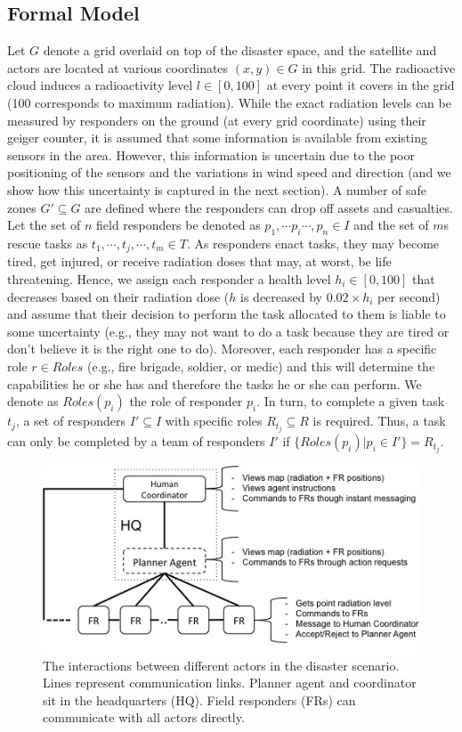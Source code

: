 \subsection{Formal Model}
\noindent Let $G$ denote a grid overlaid on top of the disaster space, and the satellite and actors are located at various coordinates $(x,y) \in G$ in this grid. The radioactive cloud induces a radioactivity level  $l \in [0,100]$ at every point it covers in the grid (100 corresponds to maximum radiation). While the exact radiation levels can be measured by responders on the ground (at every grid coordinate) using their geiger counter, it is assumed that some information is available  from existing sensors  in the area. However, this information is uncertain due to the poor positioning of the sensors and the variations in wind speed and direction (and we show how this uncertainty is captured in the next section). A number of safe zones $G' \subseteq G$ are defined where the responders can drop off assets and casualties. Let the set of $n$ field responders be denoted as $p_1, \cdots p_i \cdots, p_n \in I$ and the set of $m$s rescue tasks as  $t_1,\cdots, t_j, \cdots, t_m\in T$.  As responders enact tasks, they may become tired, get injured, or receive radiation doses that may, at worst, be life threatening. Hence, we assign each responder  a health level $h_i\in [0,100]$ that decreases based on their radiation dose ($h$ is decreased by $0.02 \times h_i $ per second) and assume that their decision to perform the task allocated to them is liable to some uncertainty (e.g., they may not want to do a task because they are tired or don't believe it is the right one to do).  Moreover, each responder has  a specific role  $r \in Roles$ (e.g., fire brigade, soldier, or medic) and this will determine the capabilities he or she has and therefore the tasks he or she can perform. We denote as $Roles(p_i)$ the role of responder $p_i$. In turn, to complete a given task $t_j$,  a set of responders $I' \subseteq I$ with specific roles $R_{t_j} \subseteq R$ is required. Thus, a task can only be completed by a team of responders $I'$ if $\{Roles(p_i) | p_i \in I'\} = R_{t_j}$. 
\begin{figure}[htbp]
\includegraphics[width=\columnwidth]{scenario.jpg}\vspace{-5mm}

\label{fig:scenario}
\caption{The interactions between different actors in the disaster scenario. Lines represent communication links. Planner agent and coordinator sit in the headquarters (HQ). Field responders (FRs) can communicate with all actors directly.}\end{figure}
